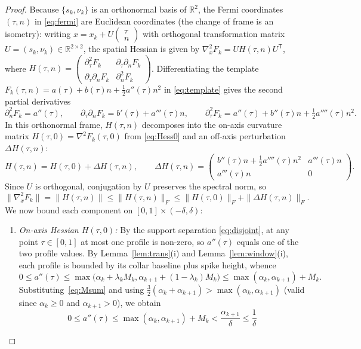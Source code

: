 \documentclass[11pt]{article}
\newcommand{\R}{\mathbb{R}}
\begin{document}
\begin{proof}
Because $\{s_k,\nu_k\}$ is an orthonormal basis of $\R^2$, the Fermi coordinates $(\tau,n)$ in \eqref{eq:fermi} are Euclidean coordinates (the change of frame is an isometry): writing $x = x_k + U\begin{pmatrix}\tau\\ n\end{pmatrix}$ with orthogonal transformation matrix $U = (s_k, \nu_k)\in\R^{2\times2}$, the spatial Hessian is given by $\nabla_x^2 F_k = U H(\tau, n) U^{\mathsf T}$, where $H(\tau, n) = \begin{pmatrix} \partial_\tau^2 F_k & \partial_\tau\partial_n F_k \\ \partial_\tau\partial_n F_k & \partial_n^2 F_k \end{pmatrix}$.
Differentiating the template $F_k(\tau,n) = a(\tau) + b(\tau)n + \tfrac12 a''(\tau)n^2$ in \eqref{eq:template} gives the second partial derivatives
\[
\partial_n^2 F_k = a''(\tau), \qquad
\partial_\tau\partial_n F_k = b'(\tau) + a'''(\tau)n, \qquad
\partial_\tau^2 F_k = a''(\tau) + b''(\tau)n + \tfrac12 a''''(\tau)n^2.
\]
In this orthonormal frame, $H(\tau, n)$ decomposes into the on-axis curvature matrix $H(\tau, 0) = \nabla^2 F_k(\tau, 0)$ from \eqref{eq:Hess0} and an off-axis perturbation $\Delta H(\tau, n)$:
\[
H(\tau, n) = H(\tau, 0) + \Delta H(\tau, n), \qquad
\Delta H(\tau, n) = \begin{pmatrix} b''(\tau)n + \tfrac12 a''''(\tau)n^2 & a'''(\tau)n \\ a'''(\tau)n & 0 \end{pmatrix}.
\]
Since $U$ is orthogonal, conjugation by $U$ preserves the spectral norm, so
\[
\|\nabla_x^2 F_k\| = \|H(\tau, n)\| \le \|H(\tau, n)\|_F \le \|H(\tau, 0)\|_F + \|\Delta H(\tau, n)\|_F.
\]
We now bound each component on $[0,1]\times(-\delta,\delta)$:
\begin{enumerate}
\item \emph{On-axis Hessian $H(\tau, 0)$:}
By the support separation \eqref{eq:disjoint}, at any point $\tau \in [0, 1]$ at most one profile is non-zero, so $a''(\tau)$ equals one of the two profile values.
By Lemma~\ref{lem:trans}(i) and Lemma~\ref{lem:window}(i), each profile is bounded by its collar baseline plus spike height, whence
\[
0\le a''(\tau)\le\max\bigl(\alpha_k + \lambda_k M_k, \alpha_{k+1} + (1-\lambda_k)M_k\bigr)\le \max(\alpha_k, \alpha_{k+1}) + M_k.
\]
Substituting~\eqref{eq:Msum} and using $\tfrac32(\alpha_k+\alpha_{k+1}) > \max(\alpha_k,\alpha_{k+1})$ (valid since $\alpha_k\ge0$ and $\alpha_{k+1}>0$), we obtain
\[
0 \le a''(\tau) \le \max(\alpha_k, \alpha_{k+1}) + M_k < \frac{\alpha_{k+1}}{\delta} \le \frac{1}{\delta}
\]
\end{enumerate}
\end{proof}
\end{document}
